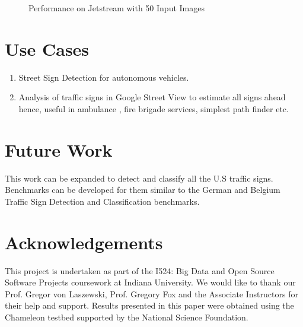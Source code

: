 \documentclass[9pt,twocolumn,twoside]{../../styles/osajnl}
\begin{document}
\begin{figure}[htbp]
\centering
{}
\caption{Performance on Jetstream with 50 Input Images}
\label{fig:jmedium50}
\end{figure}

\section{Use Cases}
\begin{enumerate}
\item Street Sign Detection for autonomous vehicles.
\item Analysis of traffic signs in Google Street View to estimate all
  signs ahead hence, useful in ambulance , fire brigade services,
  simplest path finder etc.
\end{enumerate}


\section{Future Work}
This work can be expanded to detect and classify all the U.S traffic signs. Benchmarks can be developed for them similar to the German and Belgium Traffic Sign Detection and Classification benchmarks. 


\section*{Acknowledgements}
This project is undertaken as part of the I524: Big Data and Open
Source Software Projects coursework at Indiana University. We would
like to thank our Prof. Gregor von Laszewski, Prof. Gregory Fox and
the Associate Instructors for their help and support. Results presented in this paper were obtained using the Chameleon testbed supported by the National Science Foundation.
\end{document}
